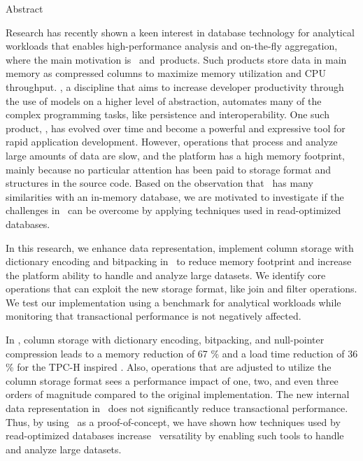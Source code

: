 {\Huge Abstract}
\vspace{1cm}

Research has recently shown a keen interest in database technology for analytical workloads that enables high-performance analysis and on-the-fly aggregation, where the main motivation is \bi~and\bd~products. Such products store data in main memory as compressed columns to maximize memory utilization and CPU throughput. \mde, a discipline that aims to increase developer productivity through the use of models on a higher level of abstraction, automates many of the complex programming tasks, like persistence and interoperability. One such product, \gap, has evolved over time and become a powerful and expressive tool for rapid application development. However, operations that process and analyze large amounts of data are slow, and the platform has a high memory footprint, mainly because no particular attention has been paid to storage format and structures in the source code. Based on the observation that \gap~has many similarities with an in-memory database, we are motivated to investigate if the challenges in \gap~can be overcome by applying techniques used in read-optimized databases. 

In this research, we enhance data representation, implement column storage with dictionary encoding and bitpacking in \gap~to reduce memory footprint and increase the platform ability to handle and analyze large datasets. We identify core operations that can exploit the new storage format, like join and filter operations. We test our implementation using a benchmark for analytical workloads while monitoring that transactional performance is not negatively affected.

In \gap, column storage with dictionary encoding, bitpacking, and null-pointer compression leads to a memory reduction of 67 \% and a load time reduction of 36 \% for the TPC-H inspired \tpchdl. Also, operations that are adjusted to utilize the column storage format sees a performance impact of one, two, and even three orders of magnitude compared to the original implementation. The new internal data representation in \gap~does not significantly reduce transactional performance. Thus, by using \gap~as a proof-of-concept, we have shown how techniques used by read-optimized databases increase \mde~versatility by enabling such tools to handle and analyze large datasets.


